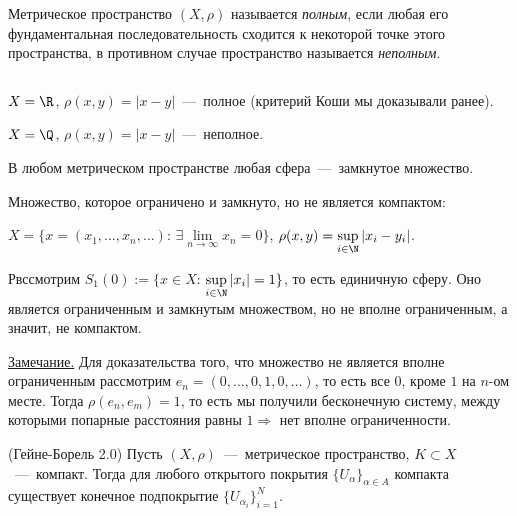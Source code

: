\begin{definition}
    Метрическое пространство $(X, \rho)$ называется \textit{полным}, если любая его фундаментальная последовательность сходится к некоторой точке этого пространства, в противном случае пространство называется \textit{неполным}.
\end{definition}
\begin{examples}$\ $

    $X = \R$, $\rho(x, y) = |x - y|$~---~полное (критерий Коши мы доказывали ранее).

    $X = \Q$, $\rho(x, y) = |x - y|$~---~неполное.
\end{examples}
\begin{proposition}
    В любом метрическом пространстве любая сфера~---~замкнутое множество.
\end{proposition}
\begin{example}
    Множество, которое ограничено и замкнуто, но не является компактом:

    $X = \{ x = (x_{1}, \ldots, x_{n}, \ldots)$: $\exists \lim\limits_{n\to \infty} x_{n} = 0\}$, $\rho(x, y) = \sup\limits_{i \in \N}|x_{i} - y_{i}|$.

    Рвссмотрим $S_{1} (0) := \{ x \in X$: $\sup\limits_{i \in \N} |x_{i}| = 1\}$, то есть единичную сферу. Оно является ограниченным и замкнутым множеством, но не вполне ограниченным, а значит, не компактом.

    \underline{Замечание.} Для доказательства того, что множество не является вполне ограниченным рассмотрим $e_n = (0, \ldots, 0, 1, 0, \ldots)$, то есть все $0$, кроме $1$ на $n$-ом месте. Тогда $\rho(e_n, e_m) = 1$, то есть мы получили бесконечную систему, между которыми попарные расстояния равны $1 \Rightarrow$ нет вполне ограниченности.
\end{example}
\begin{theorem}
    (Гейне-Борель 2.0) Пусть $(X, \rho)$~---~метрическое пространство, $K \subset X$~---~компакт. Тогда для любого открытого покрытия $\{ U_{\alpha}\}_{\alpha \in A}$ компакта существует конечное подпокрытие $\{ U_{\alpha_{i}}\}_{i = 1}^{N}$.
\end{theorem}
